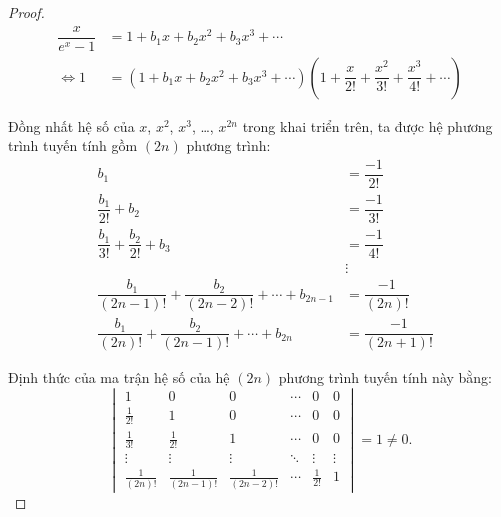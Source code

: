 \begin{proof}
    \begingroup{}
    \allowdisplaybreaks{}
    \begin{align*}
        \dfrac{x}{e^{x}-1} & = 1 + b_{1}x + b_{2}x^{2} + b_{3}x^{3} + \cdots                                                                                  \\
        \Leftrightarrow 1  & = (1 + b_{1}x + b_{2}x^{2} + b_{3}x^{3} + \cdots)\left(1 + \dfrac{x}{2!} + \dfrac{x^{2}}{3!} + \dfrac{x^{3}}{4!} + \cdots\right)
    \end{align*}
    \endgroup{}
    
    Đồng nhất hệ số của $x$, $x^{2}$, $x^{3}$, \ldots, $x^{2n}$ trong khai triển trên, ta được hệ phương trình tuyến tính gồm $(2n)$ phương trình:
    \begin{align*}
         & b_{1}                                                               & = \dfrac{-1}{2!}      \\
         & \dfrac{b_{1}}{2!} + b_{2}                                           & = \dfrac{-1}{3!}      \\
         & \dfrac{b_{1}}{3!} + \dfrac{b_{2}}{2!} + b_{3}                       & = \dfrac{-1}{4!}      \\
         &                                                                     & \vdots                \\
         & \dfrac{b_{1}}{(2n-1)!} + \dfrac{b_{2}}{(2n-2)!} + \cdots + b_{2n-1} & = \dfrac{-1}{(2n)!}   \\
         & \dfrac{b_{1}}{(2n)!} + \dfrac{b_{2}}{(2n-1)!} + \cdots + b_{2n}     & = \dfrac{-1}{(2n+1)!}
    \end{align*}
    
    Định thức của ma trận hệ số của hệ $(2n)$ phương trình tuyến tính này bằng:
    \[
        \begin{vmatrix}
            1               & 0                 & 0                 & \cdots & 0            & 0      \\
            \frac{1}{2!}    & 1                 & 0                 & \cdots & 0            & 0      \\
            \frac{1}{3!}    & \frac{1}{2!}      & 1                 & \cdots & 0            & 0      \\
            \vdots          & \vdots            & \vdots            & \ddots & \vdots       & \vdots \\
            \frac{1}{(2n)!} & \frac{1}{(2n-1)!} & \frac{1}{(2n-2)!} & \cdots & \frac{1}{2!} & 1
        \end{vmatrix} = 1 \ne 0.
    \]
    

\end{proof}
